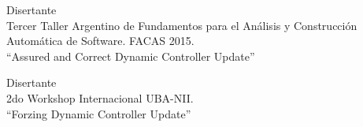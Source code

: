 \item[Marzo 2015]
Disertante\\  Tercer Taller Argentino de Fundamentos para el An\'alisis y Construcci\'on Autom\'atica de Software. FACAS 2015.\\
``Assured and Correct Dynamic Controller Update''

\item[Noviembre 2014]
Disertante\\ 2do Workshop Internacional UBA-NII.\\
``Forzing Dynamic Controller Update''
